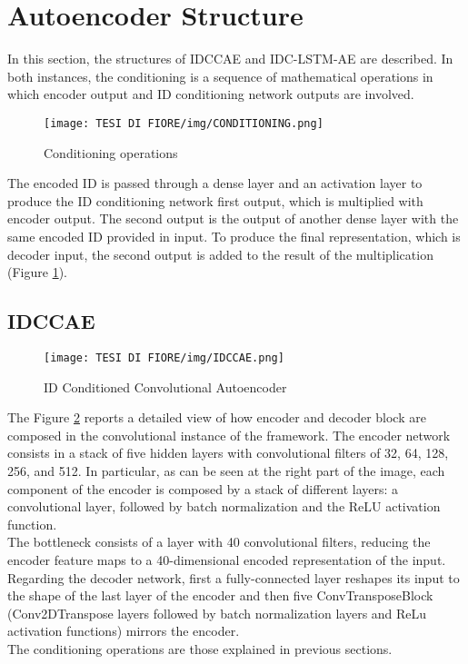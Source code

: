 \section{Autoencoder Structure}
In this section, the structures of IDCCAE and IDC-LSTM-AE are described. In both instances, the conditioning is a sequence of mathematical operations in which encoder output and ID conditioning network outputs are involved.

\begin{figure}[ht]
\texttt{[image: TESI DI FIORE/img/CONDITIONING.png]}
\centering
\caption{Conditioning operations}
\label{conditioning}
\end{figure}

The encoded ID is passed through a dense layer and an activation layer to produce the ID conditioning network first output, which is multiplied with encoder output. The second output is the output of another dense layer with the same encoded ID provided in input. To produce the final representation, which is decoder input, the second output is added to the result of the multiplication (Figure \ref{conditioning}).


\subsection{IDCCAE}

\begin{figure}[ht]
\texttt{[image: TESI DI FIORE/img/IDCCAE.png]}
\centering
\caption{ID Conditioned Convolutional Autoencoder}
\label{IDCCAE}
\end{figure}

The Figure \ref{IDCCAE} reports a detailed view of how encoder and decoder block are composed in the convolutional instance of the framework. The encoder network consists in a stack of five hidden layers with convolutional filters of 32, 64, 128, 256, and 512. In particular, as can be seen at the right part of the image, each component of the encoder is composed by a stack of different layers: a convolutional layer, followed by batch normalization and the ReLU activation function.\\
The bottleneck consists of a layer with 40 convolutional filters, reducing the encoder feature maps to a 40-dimensional encoded representation of the input. Regarding the decoder network, first a fully-connected layer reshapes its input to the shape of the last layer of the encoder and then five ConvTransposeBlock (Conv2DTranspose layers followed by batch normalization layers and ReLu activation functions) mirrors the encoder.\\
The conditioning operations are those explained in previous sections.

